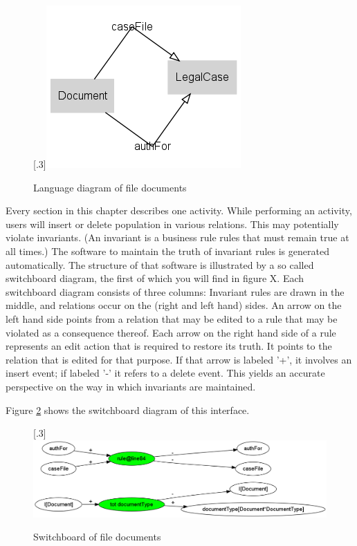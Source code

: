 \documentclass[10pt,a4paper]{report}              %
\theoremstyle{plain}\theorembodyfont{\rmfamily}\newtheorem{definition}{Definition}[section]
\theoremstyle{plain}\theorembodyfont{\rmfamily}\newtheorem{designrule}[definition]{Requirement}
\begin{document}
\begin{figure}[htb]
\begin{center}
\scalebox{.3}[.3]{\includegraphics{Servfile_documents}}
\caption{Language diagram of file documents}
\label{fig:Servfile_documents}
\end{center}
\end{figure}
Every section in this chapter describes one activity. While performing an activity, users will insert or delete population in various relations. This may potentially violate invariants. (An invariant is a business rule rules that must remain true at all times.) The software to maintain the truth of invariant rules is generated automatically. The structure of that software is illustrated by a so called switchboard diagram, the first of which you will find in figure X. Each switchboard diagram consists of three columns: Invariant rules are drawn in the middle, and relations occur on the (right and left hand) sides. An arrow on the left hand side points from a relation that may be edited to a rule that may be violated as a consequence thereof. Each arrow on the right hand side of a rule represents an edit action that is required to restore its truth. It points to the relation that is edited for that purpose. If that arrow is labeled '+', it involves an insert event; if labeled '-' it refers to a delete event. This yields an accurate perspective on the way in which invariants are maintained. 

Figure \ref{fig:SBfile_documents} shows the switchboard diagram of this interface.

\begin{figure}[htb]
\begin{center}
\scalebox{.3}[.3]{\includegraphics{SBfile_documents}}
\caption{Switchboard of file documents}
\label{fig:SBfile_documents}
\end{center}
\end{figure}
\end{document}
